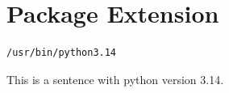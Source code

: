 
\chapter{\label{package-extension}Package Extension}
\begin{verbatim}
/usr/bin/python3.14
\end{verbatim}

\par This is a sentence with python version 3.14.
